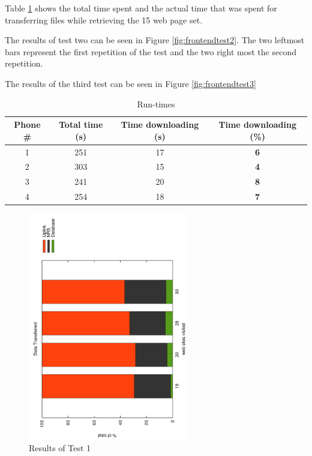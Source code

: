 Table \ref{tbl:times} shows the total time spent and the actual time that was spent for transferring files while retrieving 
the 15 web page set.

The results of test two can be seen in Figure \ref{fig:frontendtest2}. The two leftmost bars represent 
the first repetition of the test and the two right most the second repetition.

The results of the third test can be seen in Figure \ref{fig:frontendtest3}

\begin{table}[H]
		\centering
       \begin{tabular}{| c | c | c | c |}
               \hline
               Phone \# & Total time (s) & Time downloading (s) & Time downloading (\%)\\
               \hline
               1 & 251 & 17 & \textbf{6}\\
               \hline
               2 & 303 & 15 & \textbf{4}\\
               \hline
               3 & 241 & 20 & \textbf{8}\\
               \hline
               4 & 254 & 18 & \textbf{7}\\
               \hline
       \end{tabular}
       \caption{Run-times}
       \label{tbl:times}
\end{table}

\begin{figure}[H]
	\centering
		\includegraphics[width=0.62\textwidth, angle=-90]{./img/plots.pdf}
    	\caption{Results of Test 1}
	\label{fig:frontendtest1}
\end{figure}

